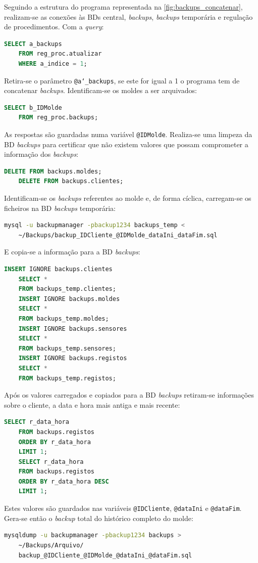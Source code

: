 \documentclass[11pt,twoside,a4paper]{report}
\begin{document}
Seguindo a estrutura do programa representada na \autoref{fig:backups_concatenar}, realizam-se as conexões às BDs central, \textit{backups}, \textit{backups} temporária e regulação de procedimentos. Com a \textit{query}:
\begin{lstlisting}[language = SQL]
	SELECT a_backups
	FROM reg_proc.atualizar
	WHERE a_indice = 1;
\end{lstlisting}
Retira-se o parâmetro \texttt{@a\char`_backups}, se este for igual a 1 o programa tem de concatenar \textit{backups}. Identificam-se os moldes a ser arquivados:
\begin{lstlisting}[language = SQL]
	SELECT b_IDMolde
	FROM reg_proc.backups;
\end{lstlisting}
As respostas são guardadas numa variável \texttt{@IDMolde}. Realiza-se uma limpeza da BD \textit{backups} para certificar que não existem valores que possam comprometer a informação dos \textit{backups}:
\begin{lstlisting}[language = SQL]
	DELETE FROM backups.moldes;
	DELETE FROM backups.clientes;
\end{lstlisting}
Identificam-se os \textit{backups} referentes ao molde e, de forma cíclica, carregam-se os ficheiros na BD \textit{backups} temporária:
\begin{lstlisting}[language = bash]
	mysql -u backupmanager -pbackup1234 backups_temp <
	~/Backups/backup_IDCliente_@IDMolde_dataIni_dataFim.sql
\end{lstlisting}
E copia-se a informação para a BD \textit{backups}:
\begin{lstlisting}[language = SQL]
	INSERT IGNORE backups.clientes
	SELECT *
	FROM backups_temp.clientes;
	INSERT IGNORE backups.moldes
	SELECT *
	FROM backups_temp.moldes;
	INSERT IGNORE backups.sensores
	SELECT *
	FROM backups_temp.sensores;
	INSERT IGNORE backups.registos
	SELECT *
	FROM backups_temp.registos;
\end{lstlisting}
Após os valores carregados e copiados para a BD \textit{backups} retiram-se informações sobre o cliente, a data e hora mais antiga e mais recente:
\begin{lstlisting}[language = SQL]
	SELECT r_data_hora
	FROM backups.registos
	ORDER BY r_data_hora
	LIMIT 1;
	SELECT r_data_hora
	FROM backups.registos
	ORDER BY r_data_hora DESC
	LIMIT 1;
\end{lstlisting}
Estes valores são guardados nas variáveis \texttt{@IDCliente}, \texttt{@dataIni} e \texttt{@dataFim}. Gera-se então o \textit{backup} total do histórico completo do molde:
\begin{lstlisting}[language = bash]
	mysqldump -u backupmanager -pbackup1234 backups >
	~/Backups/Arquivo/
	backup_@IDCliente_@IDMolde_@dataIni_@dataFim.sql
\end{lstlisting}
\end{document}
